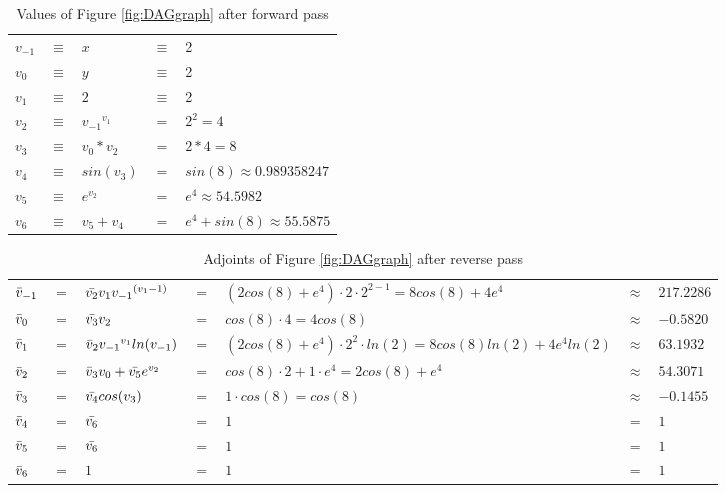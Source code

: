 \documentclass{article}
\begin{document}
\begin{table}[h!]
    \centering
    \begin{tabular}{|lclll|}
        \hline
        $v_{-1}$ & $\equiv$ & $x$ & $\equiv$ & 2\\
        $v_{0}$ & $\equiv$ & $y$ & $\equiv$ & 2\\
        \hline
        $v_{1}$ & $\equiv$ & $2$ & $\equiv$ & 2\\
        $v_{2}$ & $\equiv$ & ${v_{-1}}^{v_{1}}$ & $=$ & $ 2^2 = 4$\\
        $v_{3}$ & $\equiv$ & $v_0 * v_2$ & $=$ & $ 2 * 4 = 8$\\
        $v_{4}$ & $\equiv$ & $sin(v_3)$ & $=$ & $ sin(8) \approx 0.989358247$\\
        $v_{5}$ & $\equiv$ & $e^{v_2}$ & $=$ & $ e^4 \approx 54.5982$\\
        \hline
        $v_{6}$ & $\equiv$ & $v_5 + v_4$ & $=$ & $e^4 + sin(8) \approx 55.5875$\\
        \hline
    \end{tabular}
    \caption{Values of Figure \ref{fig:DAGgraph} after forward pass}
    \label{tab:example1FP}
\end{table}


\begin{table}[h!]
    \centering
    \begin{tabular}{|lclllll|}
        \hline
        $\Bar{v}_{-1}$ & $=$ & $\Bar{v_2}v_1 {v_{-1}}^{(v_{1}-1)}$ & $=$ & $(2cos(8)+e^4) \cdot 2 \cdot 2^{2-1} = 8cos(8)+4e^4$ & $\approx$ & $217.2286$\\
        $\Bar{v}_{0}$ & $=$ & $\Bar{v_3}v_2$ & $=$ & $cos(8)\cdot4 = 4cos(8)$ & $\approx$ & $-0.5820$\\
        \hline
        $\Bar{v}_{1}$ & $=$ & $\Bar{v}_{2}{v_{-1}}^{v_{1}}ln(v_{-1})$ & $=$ & $(2cos(8)+e^4) \cdot 2^2 \cdot ln(2) = 8cos(8)ln(2) +4e^4ln(2)$ & $\approx$ & $63.1932$\\
        $\Bar{v}_{2}$ & $=$ & $\Bar{v}_{3}v_0 + \Bar{v_5}e^{v_2}$ & $=$ & $cos(8) \cdot 2 + 1 \cdot e^{4} = 2cos(8)+e^4$ & $\approx$ & $54.3071$\\
        $\Bar{v}_{3}$ & $=$ & $\Bar{v_4}cos(v_3)$ & $=$ & $1 \cdot cos(8) = cos(8)$ & $\approx$ & $-0.1455$\\
        $\Bar{v}_{4}$ & $=$ & $\Bar{v_6}$ & $=$ & $1$ & $=$ & $1$\\
        $\Bar{v}_{5}$ & $=$ & $\Bar{v_6}$ & $=$ & $1$ & $=$ & $1$\\
        \hline
        $\Bar{v}_{6}$ & $=$ & $1$ & $=$ & $1$ & $=$ & $1$\\
        \hline
    \end{tabular}
    \caption{Adjoints of Figure \ref{fig:DAGgraph} after reverse pass}
    \label{tab:example1RP}
\end{table}
\end{document}
